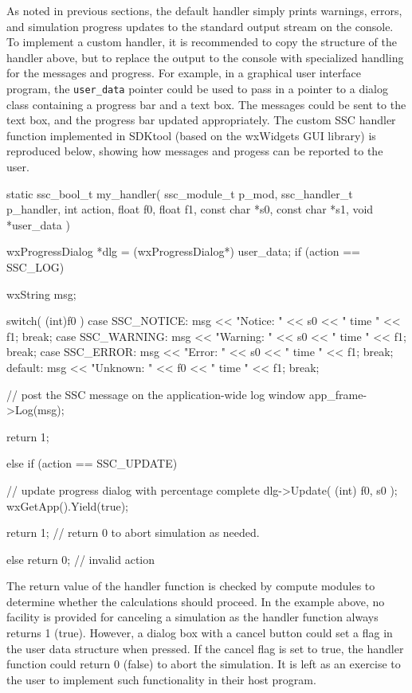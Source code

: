 \documentclass{scrartcl} %
\newcommand{\+}{\discretionary{\mbox{\scriptsize$\hookleftarrow$}}{}{}}
\begin{document}
As noted in previous sections, the default handler simply prints warnings, errors, and simulation progress updates to the standard output stream on the console.  To implement a custom handler, it is recommended to copy the structure of the handler above, but to replace the output to the console with specialized handling for the messages and progress.  For example, in a graphical user interface program, the \texttt{user\_data} pointer could be used to pass in a pointer to a dialog class containing a progress bar and a text box.  The messages could be sent to the text box, and the progress bar updated appropriately.  The custom SSC handler function implemented in SDKtool (based on the wxWidgets GUI library) is reproduced below, showing how messages and progess can be reported to the user.

\begin{verbatimtab}[4]
static ssc_bool_t my_handler( ssc_module_t p_mod, ssc_handler_t p_handler, 
     int action, float f0, float f1, const char *s0, const char *s1, 
     void *user_data )
{
	wxProgressDialog *dlg = (wxProgressDialog*) user_data;
	if (action == SSC_LOG)
	{
		wxString msg;

		switch( (int)f0 )
		{
		case SSC_NOTICE: msg << "Notice: " << s0 << " time " << f1; break;
		case SSC_WARNING: msg << "Warning: " << s0 << " time " << f1; break;
		case SSC_ERROR: msg << "Error: " << s0 << " time " << f1; break;
		default: msg << "Unknown: " << f0 << " time " << f1; break;
		}

		// post the SSC message on the application-wide log window 
		app_frame->Log(msg);

		return 1;
	}
	else if (action == SSC_UPDATE)
	{
 		// update progress dialog with percentage complete
		dlg->Update( (int) f0, s0 );
		wxGetApp().Yield(true);

		return 1; // return 0 to abort simulation as needed.
	}
	else
		return 0; // invalid action
}
\end{verbatimtab}

The return value of the handler function is checked by compute modules to determine whether the calculations should proceed.  In the example above, no facility is provided for canceling a simulation as the handler function always returns 1 (true).  However, a dialog box with a cancel button could set a flag in the user data structure when pressed.  If the cancel flag is set to true, the handler function could return 0 (false) to abort the simulation.  It is left as an exercise to the user to implement such functionality in their host program.
\end{document}

